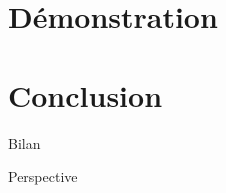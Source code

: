 \documentclass[10pt,handout]{beamer}
\begin{document}

\section{Démonstration}


\section{Conclusion}

\begin{frame}{Bilan}

\end{frame}

\begin{frame}{Perspective}

\end{frame}
\end{document}
